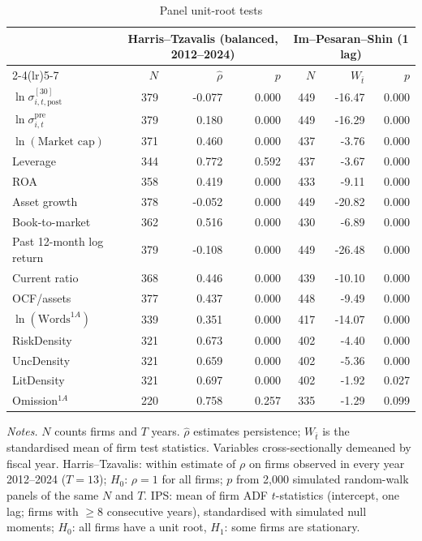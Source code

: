 \begin{table}[htbp]
\centering\shorthandoff{-}
\caption{Panel unit-root tests}
\label{tab:stationarity}
\footnotesize
\begin{tabular}{lrrrrrr}
\toprule
 & \multicolumn{3}{c}{Harris--Tzavalis (balanced, 2012--2024)} & \multicolumn{3}{c}{Im--Pesaran--Shin (1 lag)} \\
\cmidrule(lr){2-4}\cmidrule(lr){5-7}
 & $N$ & $\hat\rho$ & $p$ & $N$ & $W_{\bar t}$ & $p$ \\
\midrule
$\ln\sigma^{[30]}_{i,t,\mathrm{post}}$ & 379 & -0.077 & 0.000 & 449 & -16.47 & 0.000 \\
$\ln\sigma^{\mathrm{pre}}_{i,t}$ & 379 & 0.180 & 0.000 & 449 & -16.29 & 0.000 \\
$\ln(\text{Market cap})$ & 371 & 0.460 & 0.000 & 437 & -3.76 & 0.000 \\
Leverage & 344 & 0.772 & 0.592 & 437 & -3.67 & 0.000 \\
ROA & 358 & 0.419 & 0.000 & 433 & -9.11 & 0.000 \\
Asset growth & 378 & -0.052 & 0.000 & 449 & -20.82 & 0.000 \\
Book-to-market & 362 & 0.516 & 0.000 & 430 & -6.89 & 0.000 \\
Past 12-month log return & 379 & -0.108 & 0.000 & 449 & -26.48 & 0.000 \\
Current ratio & 368 & 0.446 & 0.000 & 439 & -10.10 & 0.000 \\
OCF/assets & 377 & 0.437 & 0.000 & 448 & -9.49 & 0.000 \\
$\ln(\text{Words}^{1A})$ & 339 & 0.351 & 0.000 & 417 & -14.07 & 0.000 \\
RiskDensity & 321 & 0.673 & 0.000 & 402 & -4.40 & 0.000 \\
UncDensity & 321 & 0.659 & 0.000 & 402 & -5.36 & 0.000 \\
LitDensity & 321 & 0.697 & 0.000 & 402 & -1.92 & 0.027 \\
Omission$^{1A}$ & 220 & 0.758 & 0.257 & 335 & -1.29 & 0.099 \\
\bottomrule
\end{tabular}
\par\smallskip
\begin{minipage}{\linewidth}\footnotesize
\emph{Notes.} $N$ counts firms and $T$ years. $\hat\rho$ estimates persistence; $W_{\bar t}$ is the standardised mean of firm test statistics. Variables cross-sectionally demeaned by fiscal year. Harris--Tzavalis: within estimate of $\rho$ on firms observed in every year 2012--2024 ($T=13$); $H_0$: $\rho=1$ for all firms; $p$ from 2{,}000 simulated random-walk panels of the same $N$ and $T$. IPS: mean of firm ADF $t$-statistics (intercept, one lag; firms with $\geq 8$ consecutive years), standardised with simulated null moments; $H_0$: all firms have a unit root, $H_1$: some firms are stationary.
\end{minipage}
\end{table}
